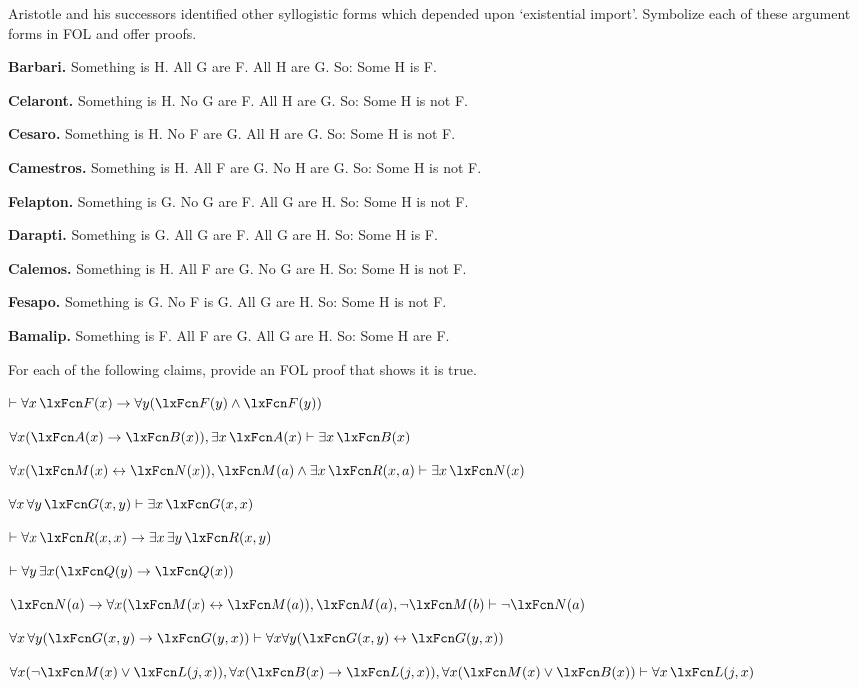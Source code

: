 \problempart
\label{pr.BarbaraEtc.proof2}
Aristotle and his successors identified other syllogistic forms which depended upon `existential import'. Symbolize each of these argument forms in FOL and offer proofs.
\begin{compactlist}
	\item \textbf{Barbari.} Something is H. All G are F. All H are G. So: Some H is F.
	\item \textbf{Celaront.} Something is H. No G are F. All H are G. So: Some H is not F.
	\item \textbf{Cesaro.} Something is H. No F are G. All H are G. So: Some H is not F.
	\item \textbf{Camestros.} Something is H. All F are G. No H are G. So: Some H is not F.
	\item \textbf{Felapton.} Something is G. No G are F. All G are H. So: Some H is not F.
	\item \textbf{Darapti.} Something is G. All G are F. All G are H. So: Some H is F.
	\item \textbf{Calemos.} Something is H. All F are G. No G are H. So: Some H is not F.
	\item \textbf{Fesapo.} Something is G. No F is G. All G are H. So: Some H is not F.
	\item \textbf{Bamalip.} Something is F. All F are G. All G are H. So: Some H are F.
\end{compactlist}

\problempart
\label{pr.someFOLproofs}
For each of the following claims, provide an FOL proof that shows it
is true.
\begin{compactlist}
\item $\proves \forall x\,\atom{F}{x} \eif \forall y(\atom{F}{y} \eand \atom{F}{y})$
\item $\forall x(\atom{A}{x}\eif \atom{B}{x}), \exists x\,\atom{A}{x} \proves \exists x\,\atom{B}{x}$
\item $\forall x(\atom{M}{x} \eiff \atom{N}{x}), \atom{M}{a} \eand \exists x\,\atom{R}{x,a} \proves \exists x\,\atom{N}{x}$
\item $\forall x\, \forall y\,\atom{G}{x,y}\proves\exists x\,\atom{G}{x,x}$
\item $\proves\forall x\,\atom{R}{x,x} \eif \exists x\, \exists y\,\atom{R}{x,y}$
\item $\proves\forall y\, \exists x (\atom{Q}{y} \eif \atom{Q}{x})$
\item $\atom{N}{a} \eif \forall x(\atom{M}{x} \eiff \atom{M}{a}), \atom{M}{a}, \enot\atom{M}{b}\proves \enot \atom{N}{a}$
\item $\forall x\, \forall y (\atom{G}{x,y} \eif \atom{G}{y,x}) \proves \forall x\forall y (\atom{G}{x,y} \eiff \atom{G}{y,x})$
\item $\forall x(\enot\atom{M}{x} \eor \atom{L}{j,x}), \forall x(\atom{B}{x}\eif \atom{L}{j,x}), \forall x(\atom{M}{x}\eor \atom{B}{x})\proves \forall x\,\atom{L}{j,x}$
\end{compactlist}


